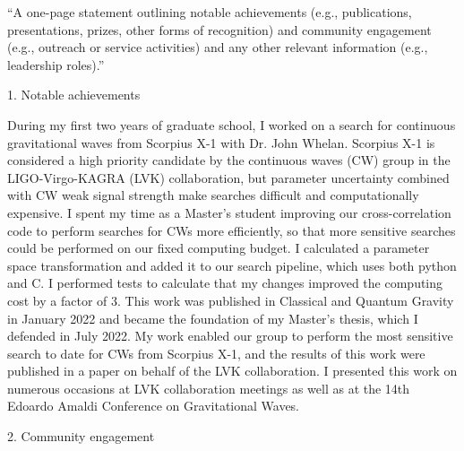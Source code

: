 \documentclass{article}
\begin{document}
``A one-page statement outlining notable achievements (e.g., publications, presentations, prizes,
other forms of recognition) and community engagement (e.g., outreach or service activities) and
any other relevant information (e.g., leadership roles).''

1. Notable achievements

During my first two years of graduate school, I worked on a search for continuous gravitational waves from Scorpius X-1 with Dr. John Whelan. Scorpius X-1 is considered a high priority candidate by the continuous waves (CW) group in the LIGO-Virgo-KAGRA (LVK) collaboration, but parameter uncertainty combined with CW weak signal strength make searches difficult and computationally expensive. I spent my time as a Master’s student improving our cross-correlation code to perform searches for CWs more efficiently, so that more sensitive searches could be performed on our fixed computing budget. I calculated a parameter space transformation and added it to our search pipeline, which uses both python and C. I performed tests to calculate that my changes improved the computing cost by a factor of 3. This work was published in Classical and Quantum Gravity in January 2022 and became the foundation of my Master’s thesis, which I defended in July 2022. My work enabled our group to perform the most sensitive search to date for CWs from Scorpius X-1, and the results of this work were published in a paper on behalf of the LVK collaboration. I presented this work on numerous occasions at LVK collaboration meetings as well as at the 14th Edoardo Amaldi Conference on Gravitational Waves.

2. Community engagement
\end{document}

